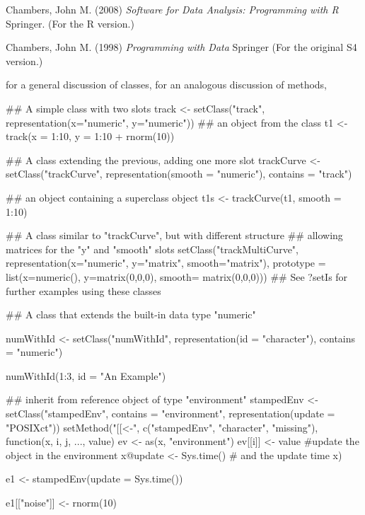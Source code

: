%
\begin{References}\relax
Chambers, John M. (2008)
\emph{Software for Data Analysis: Programming with R}
Springer.  (For the R version.)

Chambers, John M. (1998)
\emph{Programming with Data}
Springer (For the original S4 version.)
\end{References}
%
\begin{SeeAlso}\relax
{} for a general discussion of classes,
 for an analogous discussion of methods,
\end{SeeAlso}
%
\begin{Examples}
\begin{ExampleCode}

## A simple class with two slots
track <- setClass("track",
         representation(x="numeric", y="numeric"))
## an object from the class
t1 <- track(x = 1:10, y = 1:10 + rnorm(10))

## A class extending the previous, adding one more slot
trackCurve <- setClass("trackCurve",
    representation(smooth = "numeric"),
    contains = "track")

## an object containing a superclass object
t1s <- trackCurve(t1, smooth = 1:10)

## A class similar to "trackCurve", but with different structure
## allowing matrices for the "y" and "smooth" slots
setClass("trackMultiCurve",
         representation(x="numeric", y="matrix", smooth="matrix"),
         prototype = list(x=numeric(), y=matrix(0,0,0),
                          smooth= matrix(0,0,0)))
## See ?setIs for further examples using these classes

## A class that extends the built-in data type "numeric"

numWithId <- setClass("numWithId", representation(id = "character"),
         contains = "numeric")

numWithId(1:3, id = "An Example")

## inherit from reference object of type "environment"
stampedEnv <-setClass("stampedEnv", contains = "environment",
      representation(update = "POSIXct"))
setMethod("[[<-", c("stampedEnv", "character", "missing"),
   function(x, i, j, ..., value) {
       ev <- as(x, "environment")
       ev[[i]] <- value  #update the object in the environment
       x@update <- Sys.time() # and the update time
       x})


e1 <- stampedEnv(update = Sys.time())

e1[["noise"]] <- rnorm(10)


\end{ExampleCode}
\end{Examples}
